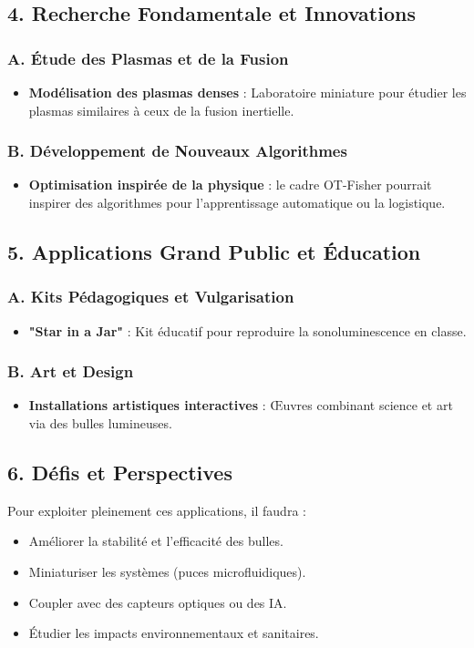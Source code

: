 \documentclass[a4paper,12pt]{article}
\begin{document}
\subsection*{4. Recherche Fondamentale et Innovations}
\subsubsection*{A. Étude des Plasmas et de la Fusion}
\begin{itemize}
    \item \textbf{Modélisation des plasmas denses} : Laboratoire miniature pour étudier les plasmas similaires à ceux de la fusion inertielle.
\end{itemize}

\subsubsection*{B. Développement de Nouveaux Algorithmes}
\begin{itemize}
    \item \textbf{Optimisation inspirée de la physique} : le cadre OT-Fisher pourrait inspirer des algorithmes pour l’apprentissage automatique ou la logistique.
\end{itemize}

\subsection*{5. Applications Grand Public et Éducation}
\subsubsection*{A. Kits Pédagogiques et Vulgarisation}
\begin{itemize}
    \item \textbf{"Star in a Jar"} : Kit éducatif pour reproduire la sonoluminescence en classe.
\end{itemize}

\subsubsection*{B. Art et Design}
\begin{itemize}
    \item \textbf{Installations artistiques interactives} : Œuvres combinant science et art via des bulles lumineuses.
\end{itemize}

\subsection*{6. Défis et Perspectives}
Pour exploiter pleinement ces applications, il faudra :
\begin{itemize}
    \item Améliorer la stabilité et l’efficacité des bulles.
    \item Miniaturiser les systèmes (puces microfluidiques).
    \item Coupler avec des capteurs optiques ou des IA.
    \item Étudier les impacts environnementaux et sanitaires.
\end{itemize}
\end{document}
